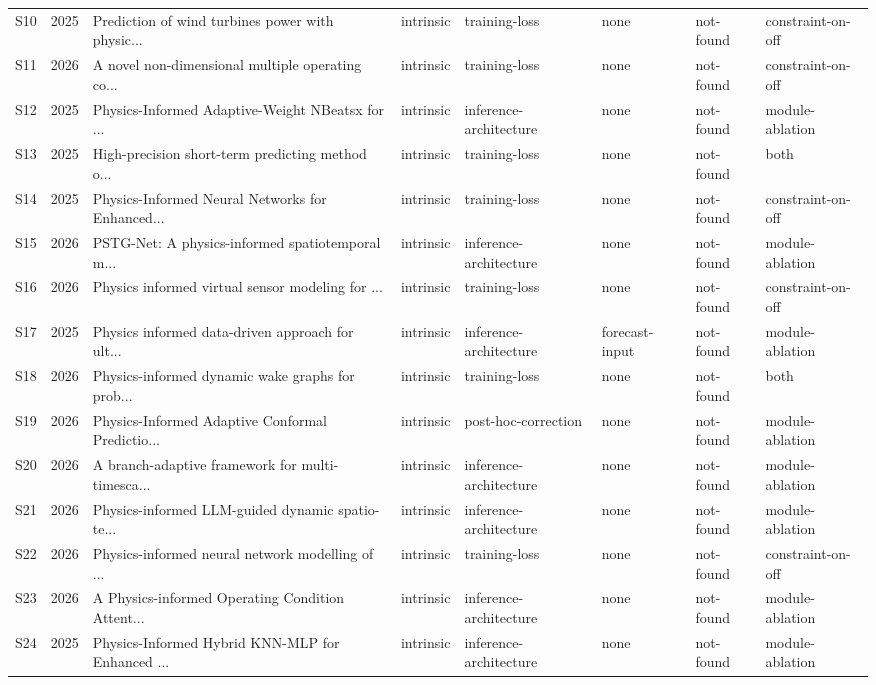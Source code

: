 \documentclass[3p,times]{elsarticle}
\begin{document}
\begin{longtable}{lp{0.7cm}p{3.8cm}p{1.6cm}p{2.0cm}p{1.5cm}p{1.4cm}p{1.6cm}}
S10 & 2025 & Prediction of wind turbines power with physic... & intrinsic & training-loss & none & not-found & constraint-on-off \\
S11 & 2026 & A novel non-dimensional multiple operating co... & intrinsic & training-loss & none & not-found & constraint-on-off \\
S12 & 2025 & Physics-Informed Adaptive-Weight NBeatsx for ... & intrinsic & inference-architecture & none & not-found & module-ablation \\
S13 & 2025 & High-precision short-term predicting method o... & intrinsic & training-loss & none & not-found & both \\
S14 & 2025 & Physics-Informed Neural Networks for Enhanced... & intrinsic & training-loss & none & not-found & constraint-on-off \\
S15 & 2026 & PSTG-Net: A physics-informed spatiotemporal m... & intrinsic & inference-architecture & none & not-found & module-ablation \\
S16 & 2026 & Physics informed virtual sensor modeling for ... & intrinsic & training-loss & none & not-found & constraint-on-off \\
S17 & 2025 & Physics informed data-driven approach for ult... & intrinsic & inference-architecture & forecast-input & not-found & module-ablation \\
S18 & 2026 & Physics-informed dynamic wake graphs for prob... & intrinsic & training-loss & none & not-found & both \\
S19 & 2026 & Physics-Informed Adaptive Conformal Predictio... & intrinsic & post-hoc-correction & none & not-found & module-ablation \\
S20 & 2026 & A branch-adaptive framework for multi-timesca... & intrinsic & inference-architecture & none & not-found & module-ablation \\
S21 & 2026 & Physics-informed LLM-guided dynamic spatio-te... & intrinsic & inference-architecture & none & not-found & module-ablation \\
S22 & 2026 & Physics-informed neural network modelling of ... & intrinsic & training-loss & none & not-found & constraint-on-off \\
S23 & 2026 & A Physics-informed Operating Condition Attent... & intrinsic & inference-architecture & none & not-found & module-ablation \\
S24 & 2025 & Physics-Informed Hybrid KNN-MLP for Enhanced ... & intrinsic & inference-architecture & none & not-found & module-ablation \\

\end{longtable}
\end{document}
